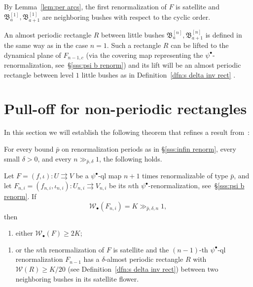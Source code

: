\documentclass{amsart}
\newcommand{\bush}{{\mathfrak B }}
\newcommand{\1}{{\mathbb 1 }}
\newcommand{\Width}{{\mathcal W}}
\begin{document}
By Lemma~\ref{lem:per arcs}, the first renormalization of $F$ is satellite and $\bush^{[1]}_a, \bush^{[1]}_{a+1}$ are neighboring bushes with respect to the cyclic order.

\begin{rem}
\label{rem:dfn:s delta inv rect} An almost periodic rectangle $R$ between little bushes $\bush^{[n]}_a,\bush^{[n]}_{a+1}$ is defined in the same way as in the case $n=1$. Such a rectangle $R$ can be lifted to the dynamical plane of $F_{n-1,c}$ (via the covering map representing the $\psi^\bullet$-renormalization, see~\S\ref{sss:psi b renorm}) and its lift will be an almost periodic rectangle between level $1$ little bushes as in Definition~\ref{dfn:s delta inv rect} . 
\end{rem}


  

\section{Pull-off for non-periodic rectangles}\label{s:Pull off for non-periodic rect} In this section we will establish the following theorem that refines a result from~\cite{K}: 
\begin{thm}
\label{thm:prim pull-off}
For every bound $\bar p$ on renormalization periods as in \S\ref{sss:infin renorm}, every small $\delta>0$, and every $n\gg_{\bar p, \delta} 1$, the following holds. 

Let $F=(f,\iota)\colon U\rightrightarrows V$ be a $\psi^\bullet$-ql map $n+1$ times renormalizable of type $\bar p$, and let $F_{n,i}=(f_{n,i},\iota_{n,i})\colon U_{n,i}\rightrightarrows V_{n,i}$ be its $n$th $\psi^\bullet$-renormalization, see~\S\ref{sss:psi b renorm}.  If 
\[ \Width_\bullet (F_{n,i}) =K\gg_{\bar  p ,\delta, n} 1,\]
then  
\begin{enumerate}[label=\text{(P)},font=\normalfont,leftmargin=*]
\item \label{case:P:thm:prim pull-off}either $\Width_\bullet(F)\ge 2K$;
\end{enumerate}
\begin{enumerate}[label=\text{(S)},font=\normalfont,leftmargin=*]
\item \label{case:S:thm:prim pull-off}or the $n$th renormalization of $F$ is satellite and the $(n-1)$-th $\psi^\bullet$-ql renormalization $F_{n-1}$ has a $\delta$-almost periodic rectangle $R$  with $\Width(R) \ge K/20$ (see Definition~\ref{dfn:s delta inv rect}) between two neighboring bushes in its satellite flower.
\end{enumerate}
\end{thm}
\end{document}
